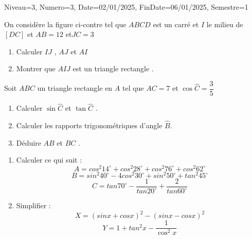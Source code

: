 \documentclass[a4paper,12pt]{article}
\begin{document}
\begin{Maquette}[DM]{Niveau=3, Numero=3, Date=02/01/2025, FinDate=06/01/2025, Semestre=1}

\begin{exercice}
\begin{minipage}{0.6\linewidth}
On considère la figure ci-contre tel que $ABCD$ est un  carré  et $I$ le milieu de $[DC]$ et $AB=12$ et$JC=3$
\begin{enumerate}
\item Calculer $IJ$ , $AJ$ et $AI$
\item Montrer que $AIJ$ est un triangle rectangle .
\end{enumerate}
\end{minipage}
\begin{minipage}{0.4\linewidth}
\end{minipage}
\end{exercice}

\begin{exercice}

Soit  $ABC$ un triangle rectangle en $A$ tel que  $AC=7$ et $\cos \widehat{C}=\dfrac{3}{5}$
\begin{enumerate}
\item Calculer  $\sin \widehat{C}$ et $\tan \widehat{C}$ .
\item Calculer les rapports trigonométriques d'angle $\widehat{B}$.
\item Déduire $AB$ et $BC$ .
\end{enumerate}
\end{exercice}

\begin{exercice}
\begin{enumerate}
\item Calculer ce qui suit :
$$A= cos^{2}14^{\circ}+cos^{2}28^{\circ}+cos^{2}76^{\circ}+cos^{2}62^{\circ}$$
$$B=sin^{2}40^{\circ}-4cos^{2}30^{\circ}+sin^{2}50^{\circ}+tan^{2}45^{\circ}$$
$$C=tan70^{\circ}-\dfrac{1}{tan20^{\circ}}+\dfrac{2}{tan60^{\circ}}$$
\item Simplifier :
$$ X=(sinx+cosx)^{2}-(sinx-cosx)^{2} $$
$$ Y=1+tan^{2}x-\dfrac{1}{\cos^{2}x}$$
\end{enumerate}

\end{exercice}
\end{Maquette}
\end{document}
